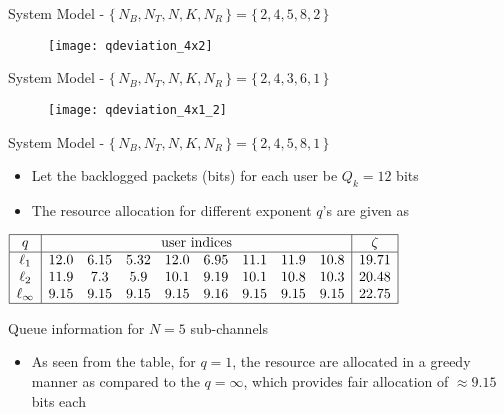 \documentclass[10pt]{beamer}
\newcommand{\me}[1]{\( #1 \)}
\begin{document}
\begin{frame}{System Model - \me{\lbrace \, N_B,N_T,N,K,N_R \, \rbrace = \lbrace \, 2,4,5,8,2 \, \rbrace}}
\begin{figure}
\texttt{[image: qdeviation\_4x2]}
\end{figure}
\end{frame}

\begin{frame}{System Model - \me{\lbrace \, N_B,N_T,N,K,N_R \, \rbrace = \lbrace \, 2,4,3,6,1 \, \rbrace}}
\begin{figure}
\texttt{[image: qdeviation\_4x1\_2]}
\end{figure}
\end{frame}

\begin{frame}{System Model - \me{\lbrace \, N_B,N_T,N,K,N_R \, \rbrace = \lbrace \, 2,4,5,8,1 \, \rbrace}}
\begin{itemize}
\item Let the backlogged packets (bits) for each user be \me{Q_k = 12} bits
\item The resource allocation for different exponent \me{q}'s are given as
\end{itemize}
\begin{table}
\centering
\renewcommand{\arraystretch}{1.25} \scriptsize
\(\begin{array}{|c|*{8}{c}|c|}
\hline
{q} & \multicolumn{8}{c|}{\text{user indices}} & {\zeta} \\
\hline
{\ell_{1}} & 12.0 &  6.15 &  5.32 & 12.0 &  6.95 & 11.1 & 11.9 & 10.8 & 19.71 \\
{\ell_2} & 11.9 & 7.3 & 5.9 & 10.1 & 9.19 & 10.1 & 10.8 & 10.3 & 20.48 \\
{\ell_{\infty}} & 9.15 & 9.15 & 9.15 & 9.15 & 9.16 & 9.15 & 9.15 & 9.15 & 22.75 \\
\hline
\end{array}\)
\caption{Queue information for \me{N=5} sub-channels}
\label{tbl-3}
\vspace{-0.35cm}
\end{table}
\begin{itemize}
\item As seen from the table, for \me{q=1}, the resource are allocated in a greedy manner as compared to the \me{q=\infty}, which provides fair allocation of \me{\approx 9.15} bits each
\end{itemize}
\end{frame}
\end{document}
